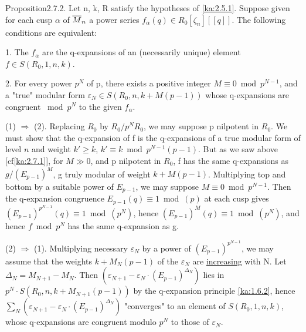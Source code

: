 \begin{kathm}{Proposition}{2.7.2.}
Let n, k, R satisfy the hypotheses of \eqref{ka:2.5.1}. Suppose given for each cusp
$\alpha$ of $\overline{M}_n$ a power series $f_\alpha(q)\in R_0[\zeta_n][[q]]$. The
following conditions are equivalent:

1. The $f_\alpha$ are the q-expansions of an (necessarily unique) element
$f\in S(R_0,1,n,k)$.

2. For every power $p^N$ of p, there exists a positive integer
$M\equiv 0\bmod p^{N-1}$, and a "true" modular form
$\varepsilon_N\in S(R_0,n,k+M(p-1))$ whose q-expansions are congruent
$\bmod p^N$ to the given $f_\alpha$.
\end{kathm}

\begin{kaproof}
(1) $\Longrightarrow$ (2). Replacing $R_0$ by $R_0/p^N R_0$, we may suppose p
nilpotent in $R_0$. We must show that the q-expansion of f is the q-expansions
of a true modular form of level $n$ and weight $k'\geq k$,
$k'\equiv k\bmod p^{N-1}(p-1)$. But as we saw above [cf\eqref{ka:2.7.1}], for $M\gg 0$,
and p nilpotent in $R_0$, f has the same q-expansions as
$g/(E_{p-1})^M$, g truly modular of weight $k+M(p-1)$. Multiplying top and
bottom by a suitable power of $E_{p-1}$, we may suppose
$M\equiv 0\bmod p^{N-1}$. Then the q-expansion congruence
$E_{p-1}(q)\equiv 1\bmod(p)$ at each cusp gives
$(E_{p-1})^{p^{N-1}}(q)\equiv 1\bmod(p^N)$, hence
$(E_{p-1})^M(q)\equiv 1\bmod(p^N)$, and hence $f\bmod p^N$ has the same
q-expansion as g.

(2) $\Longrightarrow$ (1). Multiplying necessary $\varepsilon_N$ by a power of
$(E_{p-1})^{p^{N-1}}$, we may assume that the weights $k+M_N(p-1)$ of the
$\varepsilon_N$ are \uline{increasing} with N. Let $\Delta_N=M_{N+1}-M_N$. Then
$(\varepsilon_{N+1}-\varepsilon_N\cdot(E_{p-1})^{\Delta_N})$ lies in
$p^N\cdot S(R_0,n,k+M_{N+1}(p-1))$ by the q-expansion principle \eqref{ka:1.6.2}, hence
$\sum_N(\varepsilon_{N+1}-\varepsilon_N\cdot(E_{p-1})^{\Delta_N})$
"converges" to an element of $S(R_0,1,n,k)$, whose q-expansions are congruent
modulo $p^N$ to those of $\varepsilon_N$.
\end{kaproof}


